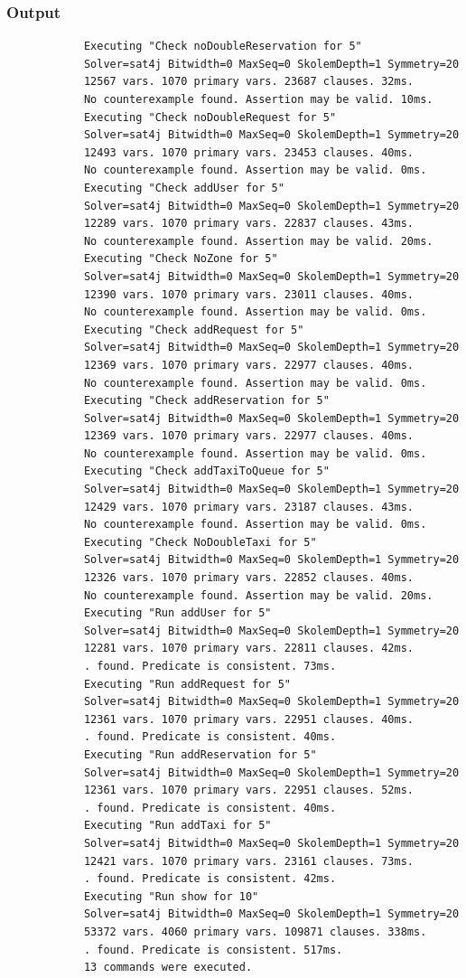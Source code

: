 \documentclass[11pt, a4paper,titlepage]{article}
\begin{document}
		\subsubsection{Output}
		\begin{verbatim}
			Executing "Check noDoubleReservation for 5"
			Solver=sat4j Bitwidth=0 MaxSeq=0 SkolemDepth=1 Symmetry=20
			12567 vars. 1070 primary vars. 23687 clauses. 32ms.
			No counterexample found. Assertion may be valid. 10ms.
			Executing "Check noDoubleRequest for 5"
			Solver=sat4j Bitwidth=0 MaxSeq=0 SkolemDepth=1 Symmetry=20
			12493 vars. 1070 primary vars. 23453 clauses. 40ms.
			No counterexample found. Assertion may be valid. 0ms.
			Executing "Check addUser for 5"
			Solver=sat4j Bitwidth=0 MaxSeq=0 SkolemDepth=1 Symmetry=20
			12289 vars. 1070 primary vars. 22837 clauses. 43ms.
			No counterexample found. Assertion may be valid. 20ms.
			Executing "Check NoZone for 5"
			Solver=sat4j Bitwidth=0 MaxSeq=0 SkolemDepth=1 Symmetry=20
			12390 vars. 1070 primary vars. 23011 clauses. 40ms.
			No counterexample found. Assertion may be valid. 0ms.
			Executing "Check addRequest for 5"
			Solver=sat4j Bitwidth=0 MaxSeq=0 SkolemDepth=1 Symmetry=20
			12369 vars. 1070 primary vars. 22977 clauses. 40ms.
			No counterexample found. Assertion may be valid. 0ms.
			Executing "Check addReservation for 5"
			Solver=sat4j Bitwidth=0 MaxSeq=0 SkolemDepth=1 Symmetry=20
			12369 vars. 1070 primary vars. 22977 clauses. 40ms.
			No counterexample found. Assertion may be valid. 0ms.
			Executing "Check addTaxiToQueue for 5"
			Solver=sat4j Bitwidth=0 MaxSeq=0 SkolemDepth=1 Symmetry=20
			12429 vars. 1070 primary vars. 23187 clauses. 43ms.
			No counterexample found. Assertion may be valid. 0ms.
			Executing "Check NoDoubleTaxi for 5"
			Solver=sat4j Bitwidth=0 MaxSeq=0 SkolemDepth=1 Symmetry=20
			12326 vars. 1070 primary vars. 22852 clauses. 40ms.
			No counterexample found. Assertion may be valid. 20ms.
			Executing "Run addUser for 5"
			Solver=sat4j Bitwidth=0 MaxSeq=0 SkolemDepth=1 Symmetry=20
			12281 vars. 1070 primary vars. 22811 clauses. 42ms.
			. found. Predicate is consistent. 73ms.
			Executing "Run addRequest for 5"
			Solver=sat4j Bitwidth=0 MaxSeq=0 SkolemDepth=1 Symmetry=20
			12361 vars. 1070 primary vars. 22951 clauses. 40ms.
			. found. Predicate is consistent. 40ms.
			Executing "Run addReservation for 5"
			Solver=sat4j Bitwidth=0 MaxSeq=0 SkolemDepth=1 Symmetry=20
			12361 vars. 1070 primary vars. 22951 clauses. 52ms.
			. found. Predicate is consistent. 40ms.
			Executing "Run addTaxi for 5"
			Solver=sat4j Bitwidth=0 MaxSeq=0 SkolemDepth=1 Symmetry=20
			12421 vars. 1070 primary vars. 23161 clauses. 73ms.
			. found. Predicate is consistent. 42ms.
			Executing "Run show for 10"
			Solver=sat4j Bitwidth=0 MaxSeq=0 SkolemDepth=1 Symmetry=20
			53372 vars. 4060 primary vars. 109871 clauses. 338ms.
			. found. Predicate is consistent. 517ms.
			13 commands were executed.
		\end{verbatim}
\end{document}
